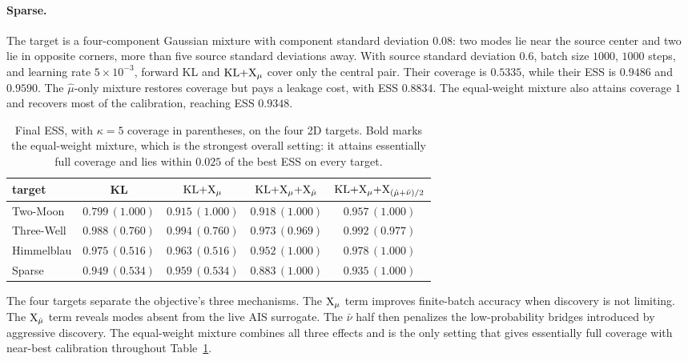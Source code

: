 \documentclass{article}
\begin{document}
\paragraph{Sparse.}
The target is a four-component Gaussian mixture with component standard deviation $0.08$: two modes lie near the source center and two lie in opposite corners, more than five source standard deviations away. With source standard deviation $0.6$, batch size $1000$, $1000$ steps, and learning rate $5\times10^{-3}$, forward KL and $\mathrm{KL}{+}\mathrm{X}_\mu$ cover only the central pair. Their coverage is $0.5335$, while their ESS is $0.9486$ and $0.9590$. The $\hat\mu$-only mixture restores coverage but pays a leakage cost, with ESS $0.8834$. The equal-weight mixture also attains coverage $1$ and recovers most of the calibration, reaching ESS $0.9348$.

\begin{table}[htb]
    \centering
    \begin{tabular}{@{}lcccc@{}}
        \toprule
        target & KL & $\mathrm{KL}{+}\mathrm{X}_\mu$ & $\mathrm{KL}{+}\mathrm{X}_\mu{+}\mathrm{X}_{\hat\mu}$ & $\mathrm{KL}{+}\mathrm{X}_\mu{+}\mathrm{X}_{(\hat\mu+\bar\nu)/2}$ \\
        \midrule
        Two-Moon   & $0.799\,(1.000)$ & $0.915\,(1.000)$ & $0.918\,(1.000)$ & $\mathbf{0.957}\,(1.000)$ \\
        Three-Well & $0.988\,(0.760)$ & $0.994\,(0.760)$ & $0.973\,(0.969)$ & $\mathbf{0.992}\,(0.977)$ \\
        Himmelblau & $0.975\,(0.516)$ & $0.963\,(0.516)$ & $0.952\,(1.000)$ & $\mathbf{0.978}\,(1.000)$ \\
        Sparse     & $0.949\,(0.534)$ & $0.959\,(0.534)$ & $0.883\,(1.000)$ & $\mathbf{0.935}\,(1.000)$ \\
        \bottomrule
    \end{tabular}
    \caption{Final ESS, with $\kappa=5$ coverage in parentheses, on the four 2D targets. Bold marks the equal-weight mixture, which is the strongest overall setting: it attains essentially full coverage and lies within $0.025$ of the best ESS on every target.}
    \label{tab: 2d-benchmark-summary}
\end{table}

The four targets separate the objective's three mechanisms. The $\mathrm{X}_\mu$ term improves finite-batch accuracy when discovery is not limiting. The $\mathrm{X}_{\hat\mu}$ term reveals modes absent from the live AIS surrogate. The $\bar\nu$ half then penalizes the low-probability bridges introduced by aggressive discovery. The equal-weight mixture combines all three effects and is the only setting that gives essentially full coverage with near-best calibration throughout Table~\ref{tab: 2d-benchmark-summary}.
\end{document}

